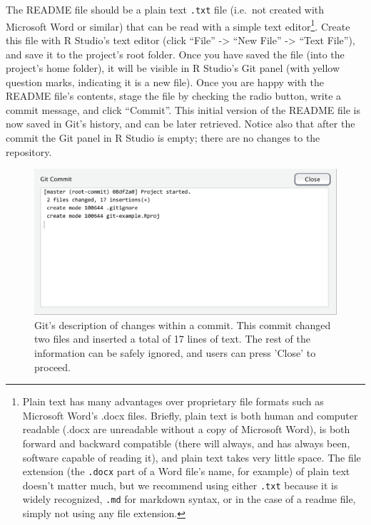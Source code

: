 \documentclass[
  american,
  ,doc,floatsintext]{apa6}
\begin{document}
The README file should be a plain text \texttt{.txt} file (i.e.~not created with Microsoft Word or similar) that can be read with a simple text editor\footnote{Plain text has many advantages over proprietary file formats such as Microsoft Word's .docx files. Briefly, plain text is both human and computer readable (.docx are unreadable without a copy of Microsoft Word), is both forward and backward compatible (there will always, and has always been, software capable of reading it), and plain text takes very little space. The file extension (the \texttt{.docx} part of a Word file's name, for example) of plain text doesn't matter much, but we recommend using either \texttt{.txt} because it is widely recognized, \texttt{.md} for markdown syntax, or in the case of a readme file, simply not using any file extension.}. Create this file with R Studio's text editor (click \enquote{File} -\textgreater{} \enquote{New File} -\textgreater{} \enquote{Text File}), and save it to the project's root folder. Once you have saved the file (into the project's home folder), it will be visible in R Studio's Git panel (with yellow question marks, indicating it is a new file). Once you are happy with the README file's contents, stage the file by checking the radio button, write a commit message, and click \enquote{Commit}. This initial version of the README file is now saved in Git's history, and can be later retrieved. Notice also that after the commit the Git panel in R Studio is empty; there are no changes to the repository.

\begin{figure}

{\centering \includegraphics{images/rstudio-git-3} 

}

\caption{Git's description of changes within a commit. This commit changed two files and inserted a total of 17 lines of text. The rest of the information can be safely ignored, and users can press 'Close' to proceed.}\label{fig:rstudio-git-3}
\end{figure}
\end{document}
